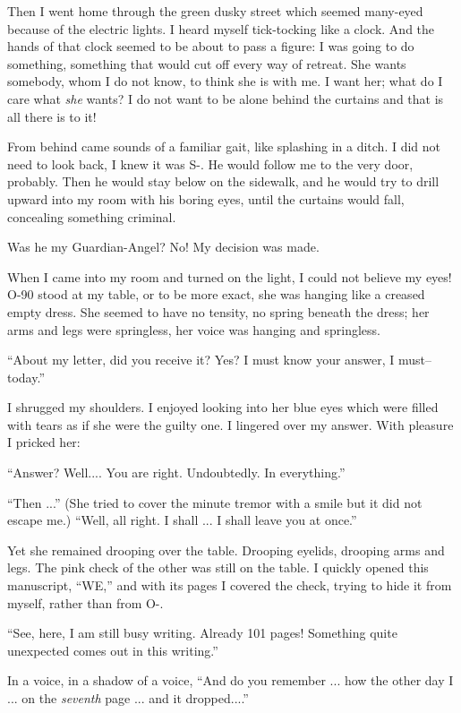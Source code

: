 \documentclass[11pt,openany]{book}
\begin{document}
Then I went home through the green dusky street which seemed many-eyed because of the electric lights. I heard myself tick-tocking like a clock. And the hands of that clock seemed to be about to pass a figure: I was going to do something, something that would cut off every way of retreat. She wants somebody, whom I do not know, to think she is with me. I want her; what do I care what \emph{she} wants? I do not want to be alone behind the curtains and that is all there is to it!

From behind came sounds of a familiar gait, like splashing in a ditch. I did not need to look back, I knew it was S-. He would follow me to the very door, probably. Then he would stay below on the sidewalk, and he would try to drill upward into my room with his boring eyes, until the curtains would fall, concealing something criminal.

Was he my Guardian-Angel? No! My decision was made.

When I came into my room and turned on the light, I could not believe my eyes! O-90 stood at my table, or to be more exact, she was hanging like a creased empty dress. She seemed to have no tensity, no spring beneath the dress; her arms and legs were springless, her voice was hanging and springless.

``About my letter, did you receive it? Yes? I must know your answer, I must--today.''

I shrugged my shoulders. I enjoyed looking into her blue eyes which were filled with tears as if she were the guilty one. I lingered over my answer. With pleasure I pricked her:

``Answer? Well.... You are right. Undoubtedly. In everything.''

``Then ...'' (She tried to cover the minute tremor with a smile but it did not escape me.) ``Well, all right. I shall ... I shall leave you at once.''

Yet she remained drooping over the table. Drooping eyelids, drooping arms and legs. The pink check of the other was still on the table. I quickly opened this manuscript, ``WE,'' and with its pages I covered the check, trying to hide it from myself, rather than from O-.

``See, here, I am still busy writing. Already 101 pages! Something quite unexpected comes out in this writing.''

In a voice, in a shadow of a voice, ``And do you remember ... how the other day I ... on the \emph{seventh} page ... and it dropped....''
\end{document}
